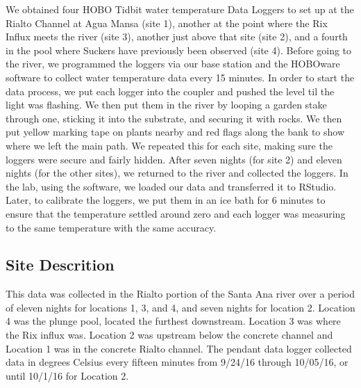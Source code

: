 \documentclass{article}
\begin{document}
We obtained four HOBO Tidbit water temperature Data Loggers to set up at the Rialto Channel at Agua Mansa (site 1), another at the point where the Rix Influx meets the river (site 3), another just above that site (site 2), and a fourth in the pool where Suckers have previously been observed (site 4). Before going to the river, we programmed the loggers via our base station and the HOBOware software to collect water temperature data every 15 minutes. In order to start the data process, we put each logger into the coupler and pushed the level til the light was flashing. We then put them in the river by looping a garden stake through one, sticking it into the substrate, and securing it with rocks. We then put yellow marking tape on plants nearby and red flags along the bank to show where we left the main path. We repeated this for each site, making sure the loggers were secure and fairly hidden. After seven nights (for site 2) and eleven nights (for the other sites), we returned to the river and collected the loggers. In the lab, using the software, we loaded our data and transferred it to RStudio. Later, to calibrate the loggers, we put them in an ice bath for 6 minutes to ensure that the temperature settled around zero and each logger was measuring to the same temperature with the same accuracy.

\subsection{Site Descrition}
This data was collected in the Rialto portion of the Santa Ana river over a period of eleven nights for locations 1, 3, and 4, and seven nights for location 2. Location 4 was the plunge pool, located the furthest downstream. Location 3 was where the Rix influx was. Location 2 was upstream below the concrete channel and Location 1 was in the concrete Rialto channel. The pendant data logger collected data in degrees Celsius every fifteen minutes from 9/24/16 through 10/05/16, or until 10/1/16 for Location 2. 
\end{document}
